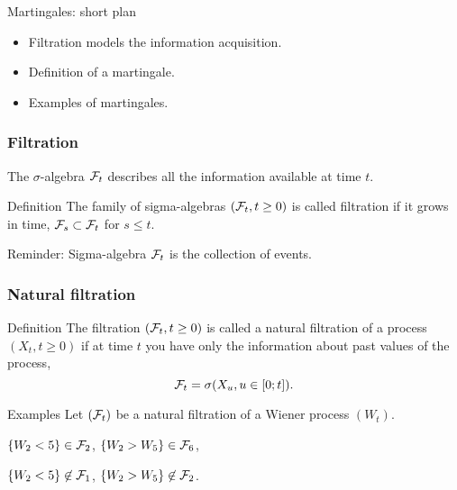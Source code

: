 

\begin{frame} %

    
\end{frame}
    
    
\begin{frame}{Martingales: short plan}
    
      \begin{itemize}[<+->]
        \item \alert{Filtration} models the information acquisition.
        \item Definition of a \alert{martingale}.
        \item \alert{Examples} of martingales.
      \end{itemize}
    
\end{frame}

\begin{frame}
    \frametitle{Filtration}

    \pause
    The $\sigma$-algebra $\mathcal{F}_t$ describes all the information available at time $t$. 

    \pause
    \begin{block}{Definition \formalduck}
        The family of sigma-algebras $(\mathcal{F}_t, t\geq 0)$ is called \alert{filtration} if it grows in time, 
        $\mathcal{F}_s \subset \mathcal{F}_t$ for $s \leq t$.
    \end{block}

    \pause 
    Reminder: Sigma-algebra $\mathcal{F}_t$ is the collection of events. 

\end{frame}


\begin{frame}
    \frametitle{Natural filtration}

    \pause
    \begin{block}{Definition \formalduck}
        The filtration $(\mathcal{F}_t, t\geq 0)$ is called a \alert{natural filtration} of a process $(X_t, t\geq 0)$ if
        at time $t$ you have only the information about past values of the process, 
        \[
                \mathcal{F}_t = \sigma(X_u, u\in [0;t]).  
        \]
    \end{block}

    \pause 
    \begin{block}{Examples}
        Let $(\mathcal{F}_t)$ be a natural filtration of a Wiener process $(W_t)$. \pause
        
        $\{W_2 < 5\} \in \mathcal{F}_2$, \pause $\{W_2 > W_5\} \in \mathcal{F}_6$, \pause 
        
        $\{W_2 < 5\} \not\in \mathcal{F}_1$, \pause $\{W_2 > W_5 \} \not\in \mathcal{F}_2$.
    \end{block}

\end{frame}

